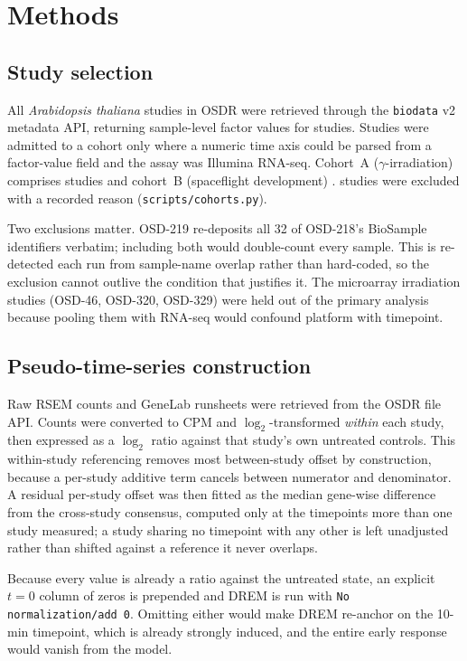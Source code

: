 \section{Methods}

\subsection{Study selection}

All \textit{Arabidopsis thaliana} studies in OSDR were retrieved through the
\texttt{biodata} v2 metadata API, returning sample-level factor values for
\NumArabidopsisStudiesScreened{} studies. Studies were admitted to a cohort only where a
numeric time axis could be parsed from a factor-value field and the assay was Illumina
RNA-seq. Cohort~A ($\gamma$-irradiation) comprises \NumCohortAStudies{} studies and
cohort~B (spaceflight development) \NumCohortBStudies{}.
\NumExcludedStudies{} studies were excluded with a recorded reason
(\texttt{scripts/cohorts.py}).

Two exclusions matter. OSD-219 re-deposits all 32 of OSD-218's BioSample identifiers
verbatim; including both would double-count every sample. This is re-detected each run
from sample-name overlap rather than hard-coded, so the exclusion cannot outlive the
condition that justifies it. The microarray irradiation studies (OSD-46, OSD-320,
OSD-329) were held out of the primary analysis because pooling them with RNA-seq would
confound platform with timepoint.

\subsection{Pseudo-time-series construction}

Raw RSEM counts and GeneLab runsheets were retrieved from the OSDR file API. Counts were
converted to CPM and $\log_2$-transformed \emph{within} each study, then expressed as a
$\log_2$ ratio against that study's own untreated controls. This within-study referencing
removes most between-study offset by construction, because a per-study additive term
cancels between numerator and denominator. A residual per-study offset was then fitted as
the median gene-wise difference from the cross-study consensus, computed only at the
\NumSeriesSharedTimepoints{} timepoints more than one study measured; a study sharing no
timepoint with any other is left unadjusted rather than shifted against a reference it
never overlaps.

Because every value is already a ratio against the untreated state, an explicit $t=0$
column of zeros is prepended and DREM is run with
\texttt{No normalization/add 0}. Omitting either would make DREM re-anchor on the 10-min
timepoint, which is already strongly induced, and the entire early response would vanish
from the model.

